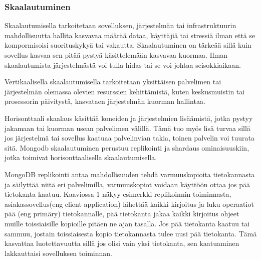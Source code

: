 \subsubsection{Skaalautuminen}




Skaalautumisella tarkoitetaan sovelluksen, järjestelmän tai infrastruktuurin
mahdollisuutta hallita kasvavaa määrää dataa, käyttäjiä tai stressiä ilman että se kompormisoisi suorituskykyä tai vakautta.
Skaalautuminen on tärkeää sillä kuin sovellus kasvaa sen pitää pystyä käsittelemään kasvavaa kuormaa.
Ilman skaalautumista järjestelmästä voi tulla hidas tai se voi johtaa seisokkiaikaan.
\medskip

Vertikaalisella skaalautumisella tarkoitetaan yksittäisen palvelimen tai järjestelmän olemassa olevien resurssien kehittämistä, 
kuten keskusmuistin tai prosessorin päivitystä, kasvataen järjestelmän kuorman hallintaa.
\medskip

Horisonttaali skaalaus käsittää koneiden ja järjestelmien lisäämistä, jotka pystyy jakamaan tai kuorman usean palvelimen välillä.
Tämä tuo myös lisä turvaa sillä jos järjestelmä tai sovellus kaatuaa palvelinvian takia, 
toinen palvelin voi tuurata sitä.
Mongodb skaalautuminen perustuu replikointi ja shardaus ominaisuuskiin, jotka toimivat horisonttaalisella skaalautumisella. 
\medskip










MongoDB replikointi antaa mahdollisuuden tehdä varmuuskopioita tietokannasta ja säilyttää niitä eri palvelimilla, 
varmuuskopiot voidaan käyttöön ottaa jos pää tietokanta kaatuu. 
%
Kaaviossa 1 näkyy esimerkki replikoinnin toiminnasta, asiakassovellus(eng client application) lähettää kaikki kirjoitus ja luku operaatiot pää (eng primäry) tietokannalle, 
pää tietokanta jakaa kaikki kirjoitus ohjeet muille toissiaisille kopioille pitäen ne ajan tasalla.
Jos pää tietokanta kaatuu tai sammuu, jostain toissiaisesta kopio tietokannasta tulee uusi pää tietokanta.
Tämä kasvattaa luotettavuutta sillä jos olisi vain yksi tietokanta, sen kaatuaminen lakkauttaisi sovelluksen toiminnan. 
\medskip
\bigskip

